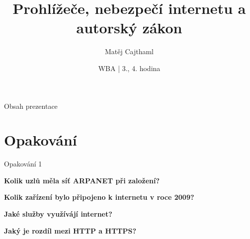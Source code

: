 \documentclass[aspectratio=169]{beamer}
\title{Prohlížeče, nebezpečí internetu a autorský zákon}
\date{WBA | 3., 4. hodina}
\author[Cajthaml]{Matěj Cajthaml}
\begin{document}
\begin{frame}
\titlepage
\end{frame}

\begin{frame}{Obsah prezentace}
    \begin{cardTiny}
        \begin{minipage}{\textwidth}
            \vspace{1ex}
            \tableofcontents
        \end{minipage}
    \end{cardTiny}
\end{frame}



\section{Opakování}

\begin{frame}{Opakování 1}
    \begin{cardTiny}
        \begin{center}
            \textbf{Kolik uzlů měla síť ARPANET při založení?}
        \end{center}
    \end{cardTiny}
    \begin{cardTiny}
        \begin{center}
            \textbf{Kolik zařízení bylo připojeno k internetu v roce 2009?}
        \end{center}
    \end{cardTiny}
       
    \begin{cardTiny}
        \begin{center}
            \textbf{Jaké služby využívájí internet?}
        \end{center}
    \end{cardTiny} 
    \begin{cardTiny}
        \begin{center}
            \textbf{Jaký je rozdíl mezi HTTP a HTTPS?}
        \end{center}
    \end{cardTiny}
\end{frame}
\end{document}
